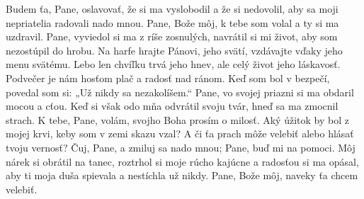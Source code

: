 Budem ťa, Pane, oslavovať, že si ma vyslobodil
a že si nedovolil, aby sa moji nepriatelia radovali nado mnou.
\versseparator
Pane, Bože môj, k tebe som volal a ty si ma uzdravil.
\versseparator
Pane, vyviedol si ma z ríše zosnulých,
navrátil si mi život, aby som nezostúpil do hrobu.
\versseparator
Na harfe hrajte Pánovi, jeho svätí,
vzdávajte vďaky jeho menu svätému.
\versseparator
Lebo len chvíľku trvá jeho hnev,
ale celý život jeho láskavosť.
\versseparator
Podvečer je nám hosťom plač
a radosť nad ránom.
\versseparator
Keď som bol v bezpečí, povedal som si:
„Už nikdy sa nezakolíšem.“
\versseparator
Pane, vo svojej priazni si ma obdaril
mocou a cťou.
\versseparator
Keď si však odo mňa odvrátil svoju tvár,
hneď sa ma zmocnil strach.
\versseparator
K tebe, Pane, volám,
svojho Boha prosím o milosť.
\versseparator
Aký úžitok by bol z mojej krvi,
keby som v zemi skazu vzal?
\versseparator
A či ťa prach môže velebiť
alebo hlásať tvoju vernosť?
\versseparator
Čuj, Pane, a zmiluj sa nado mnou;
Pane, buď mi na pomoci.
\versseparator
Môj nárek si obrátil na tanec,
roztrhol si moje rúcho kajúcne a radosťou si ma opásal,
\versseparator
aby ti moja duša spievala a nestíchla už nikdy.
Pane, Bože môj, naveky ťa chcem velebiť.
